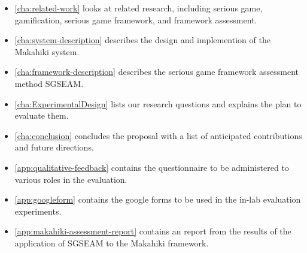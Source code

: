 \begin{itemize}
	\item \autoref{cha:related-work} looks at related research, including serious game, gamification, serious game framework, and framework assessment.
	\item \autoref{cha:system-description} describes the design and implemention of the Makahiki system.
    \item \autoref{cha:framework-description} describes the serious game framework assessment method SGSEAM.
	\item \autoref{cha:ExperimentalDesign} lists our research questions and explains the plan to evaluate them.
	\item \autoref{cha:conclusion} concludes the proposal with a list of anticipated contributions and future directions.
	\item \autoref{app:qualitative-feedback} contains the questionnaire to be administered to various roles in the evaluation.
    \item \autoref{app:googleform} contains the google forms to be used in the in-lab evaluation experiments.
    \item \autoref{app:makahiki-assessment-report} contains an report from the results of the application of SGSEAM to the Makahiki framework.
\end{itemize}
